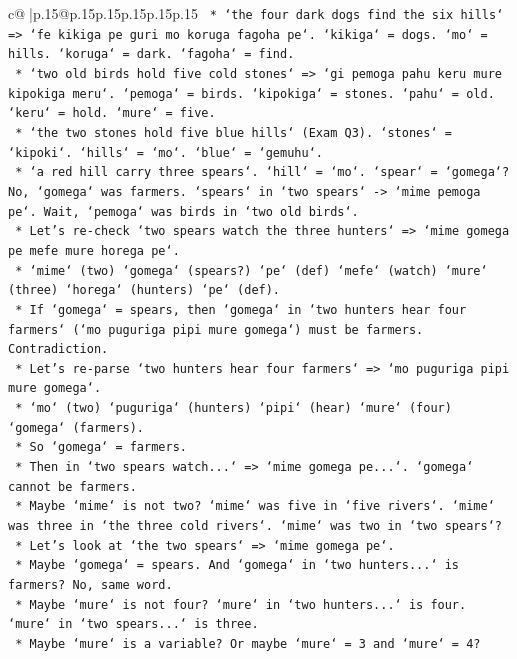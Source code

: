 \documentclass{article}
\begin{document}
{\begin{supertabular}{c@{$\;$}|p{.15\linewidth}@{}p{.15\linewidth}p{.15\linewidth}p{.15\linewidth}p{.15\linewidth}p{.15\linewidth}}
{{{\texttt{        *   `the four dark dogs find the six hills` => `fe kikiga pe guri mo koruga fagoha pe`. `kikiga` = dogs. `mo` = hills. `koruga` = dark. `fagoha` = find.} \\
\texttt{        *   `two old birds hold five cold stones` => `gi pemoga pahu keru mure kipokiga meru`. `pemoga` = birds. `kipokiga` = stones. `pahu` = old. `keru` = hold. `mure` = five.} \\
\texttt{        *   `the two stones hold five blue hills` (Exam Q3). `stones` = `kipoki`. `hills` = `mo`. `blue` = `gemuhu`.} \\
\texttt{        *   `a red hill carry three spears`. `hill` = `mo`. `spear` = `gomega`? No, `gomega` was farmers. `spears` in `two spears` {-}> `mime pemoga pe`. Wait, `pemoga` was birds in `two old birds`.} \\
\texttt{        *   Let's re{-}check `two spears watch the three hunters` => `mime gomega pe mefe mure horega pe`.} \\
\texttt{        *   `mime` (two) `gomega` (spears?) `pe` (def) `mefe` (watch) `mure` (three) `horega` (hunters) `pe` (def).} \\
\texttt{        *   If `gomega` = spears, then `gomega` in `two hunters hear four farmers` (`mo puguriga pipi mure gomega`) must be farmers. Contradiction.} \\
\texttt{        *   Let's re{-}parse `two hunters hear four farmers` => `mo puguriga pipi mure gomega`.} \\
\texttt{        *   `mo` (two) `puguriga` (hunters) `pipi` (hear) `mure` (four) `gomega` (farmers).} \\
\texttt{        *   So `gomega` = farmers.} \\
\texttt{        *   Then in `two spears watch...` => `mime gomega pe...`. `gomega` cannot be farmers.} \\
\texttt{        *   Maybe `mime` is not two? `mime` was five in `five rivers`. `mime` was three in `the three cold rivers`. `mime` was two in `two spears`?} \\
\texttt{        *   Let's look at `the two spears` => `mime gomega pe`.} \\
\texttt{        *   Maybe `gomega` = spears. And `gomega` in `two hunters...` is farmers? No, same word.} \\
\texttt{        *   Maybe `mure` is not four? `mure` in `two hunters...` is four. `mure` in `two spears...` is three.} \\
\texttt{        *   Maybe `mure` is a variable? Or maybe `mure` = 3 and `mure` = 4?} \\
}}}
\end{supertabular}}
\end{document}

